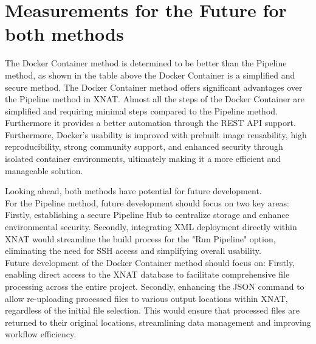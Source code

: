


















 
\section{Measurements for the Future for both methods}

The Docker Container method is determined to be better than the Pipeline method, as shown in the table above the Docker Container is a simplified and secure method.  
The Docker Container method offers significant advantages over the Pipeline method in XNAT.
Almost all the steps of the Docker Container are simplified and requiring minimal steps compared to the Pipeline method. Furthermore it provides a better automation through the REST API support.  Furthermore, Docker's usability is improved with prebuilt image reusability, high reproducibility, strong community support, and enhanced security through isolated container environments, ultimately making it a more efficient and manageable solution.

Looking ahead, both methods have potential for future development.\\
For the Pipeline method, future development should focus on two key areas: Firstly, establishing a secure Pipeline Hub to centralize storage and enhance environmental security. Secondly, integrating XML deployment directly within XNAT would streamline the build process for the "Run Pipeline" option, eliminating the need for SSH access and simplifying overall usability.\\
Future development of the Docker Container method should focus on: Firstly, enabling direct access to the XNAT database to facilitate comprehensive file processing across the entire project. Secondly, enhancing the JSON command to allow re-uploading processed files to various output locations within XNAT, regardless of the initial file selection. This would ensure that processed files are returned to their original locations, streamlining data management and improving workflow efficiency.
